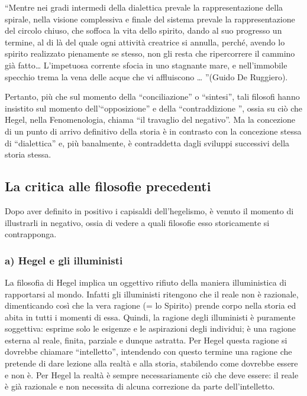 \documentclass[a4paper,12pt,oneside,openany]{book}%
\begin{document}
“Mentre nei gradi intermedi della dialettica prevale la rappresentazione della spirale, nella visione complessiva e finale del sistema prevale la rappresentazione del circolo chiuso, che soffoca la vita dello spirito, dando al suo progresso un termine, al di là del quale ogni attività creatrice si annulla, perché, avendo lo spirito realizzato pienamente se stesso, non gli resta che ripercorrere il cammino già fatto… L’impetuosa corrente sfocia in uno stagnante mare, e nell’immobile specchio trema la vena delle acque che vi affluiscono … ”(Guido De Ruggiero).

Pertanto, più che sul momento della “conciliazione” o “sintesi”, tali filosofi hanno insistito sul momento dell’“opposizione” e della “contraddizione ”, ossia su ciò che Hegel, nella Fenomenologia, chiama “il travaglio del negativo”. Ma la concezione di un punto di arrivo definitivo della storia è in contrasto con la concezione stessa di “dialettica” e, più banalmente, è contraddetta dagli sviluppi successivi della storia stessa.

\subsection*{La critica alle filosofie precedenti}

Dopo aver definito in positivo i capisaldi dell’hegelismo, è venuto il momento di illu­strarli in negativo, ossia di vedere a quali filosofie esso storicamente si contrapponga.

\subsubsection*{a) Hegel e gli illuministi}

La filosofia di Hegel implica un oggettivo rifiuto della maniera illuministica di rapportarsi al mondo. Infatti gli illuministi ritengono che il reale non è razionale, dimenticando così che la vera ragione (= lo Spirito) prende corpo nella storia ed abita in tutti i momenti di essa. Quindi, la ragione degli illuministi è puramente soggettiva: esprime solo le esigenze e le aspira­zioni degli individui; è una ragione esterna al reale, finita, parziale e dunque astratta. Per Hegel questa ragione si dovrebbe chiamare “intelletto”, intendendo con questo termine una ragione che pretende di dare lezione alla realtà e alla storia, stabilendo come dovrebbe essere e non è. Per Hegel la realtà è sempre necessariamente ciò che deve essere: il reale è già razionale e non necessita di alcuna correzione da parte dell’intelletto.
\end{document}
